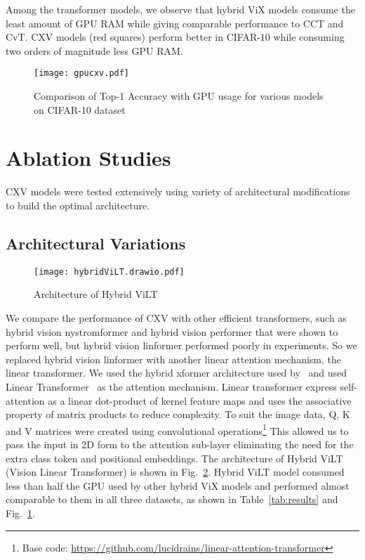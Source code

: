 \documentclass{article}
\begin{document}
Among the transformer models, we observe that hybrid ViX models consume the least amount of GPU RAM while giving comparable performance to CCT and CvT. CXV models (red squares) perform  better in CIFAR-10 while consuming two orders of magnitude less GPU RAM. 


\begin{figure}[h]
\centering
\texttt{[image: gpucxv.pdf]}
\caption{Comparison of Top-1 Accuracy with GPU usage for various models on CIFAR-10 dataset}
\label{fig:GPU}
\end{figure}



\section{Ablation Studies}

CXV models were tested extensively using variety of architectural modifications to build the optimal architecture.

\subsection{Architectural Variations}

\begin{figure}[h]
\centering
\texttt{[image: hybridViLT.drawio.pdf]}
\caption{Architecture of Hybrid ViLT}
\label{fig:ViLT}
\end{figure}


We compare the performance of CXV with other efficient transformers, such as hybrid vision nystromformer and hybrid vision performer that were shown to perform well, but hybrid vision linformer performed poorly in experiments. So we replaced hybrid vision linformer with another linear attention mechanism, the linear transformer. We used the hybrid xformer architecture used by~\cite{jeevan2021vision} and used Linear Transformer~\cite{katharopoulos2020transformers} as the attention mechanism. Linear transformer express self-attention as a linear dot-product of kernel feature maps and uses the associative property of matrix products to reduce complexity. To suit the image data, Q, K and V matrices were created using convolutional operations\footnote{Base code: \href{https://github.com/lucidrains/linear-attention-transformer/blob/master/linear_attention_transformer/images.py}{https://github.com/lucidrains/linear-attention-transformer}} This allowed us to pass the input in 2D form to the attention sub-layer eliminating the need for the extra class token and positional embeddings. The architecture of Hybrid ViLT (Vision Linear Transformer) is shown in Fig.~\ref{fig:ViLT}. Hybrid ViLT model consumed less than half the GPU used by other hybrid ViX models and performed almost comparable to them in all three datasets, as shown in Table~\ref{tab:results} and Fig.~\ref{fig:GPU}. 
\end{document}
